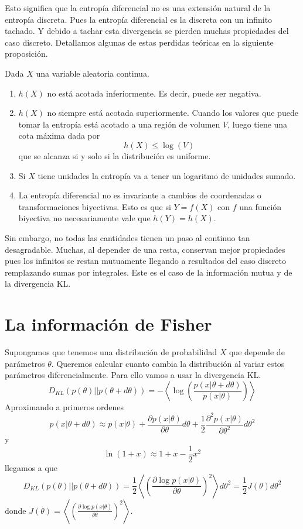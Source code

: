 Esto significa que la entrop\'ia diferencial no es una extensi\'on natural de la entrop\'ia discreta. Pues la entrop\'ia diferencial es la discreta con un infinito tachado. Y debido a tachar esta divergencia se pierden muchas propiedades del caso discreto. Detallamos algunas de estas perdidas te\'oricas en la siguiente proposici\'on.
\begin{theorem}
    Dada $X$ una variable aleatoria continua.
    \begin{enumerate}
    \item $h(X)$ no est\'a acotada inferiormente. Es decir, puede ser negativa.
    \item $h(X)$ no siempre est\'a acotada superiormente. Cuando los valores que puede tomar la entrop\'ia est\'a acotado a una regi\'on de volumen $V$, luego tiene una cota m\'axima dada por
    \begin{equation}
        h(X) \leq \log(V)
    \end{equation}
    que se alcanza si y solo si la distribuci\'on es uniforme.
    \item Si $X$ tiene unidades la entrop\'ia va a tener un logaritmo de unidades sumado.
    \item La entrop\'ia diferencial no es invariante a cambios de coordenadas o transformaciones biyectivas. Esto es que si $Y=f(X)$ con $f$ una funci\'on biyectiva no necesariamente vale que $h(Y) = h(X)$.
\end{enumerate}
\end{theorem}
Sin embargo, no todas las cantidades tienen un paso al continuo tan desagradable. Muchas, al depender de una resta, conservan mejor propiedades pues los infinitos se restan mutuamente llegando a resultados del caso discreto remplazando sumas por integrales. Este es el caso de la informaci\'on mutua y de la divergencia KL. 
\section{La informaci\'on de Fisher}
Supongamos que tenemos una distribuci\'on de probabilidad $X$ que depende de par\'ametros $\theta$. Queremos calcular cuanto cambia la distribuci\'on al variar estos par\'ametros diferencialmente. Para ello vamos a usar la divergencia KL.
$$
    D_{KL}(p(\theta)||p(\theta+d\theta))
    =    -\left\langle \log\left(\frac{p(x|\theta+d\theta)}{p(x|\theta)}\right)\right\rangle
$$
Aproximando a primeros ordenes
\begin{equation}
    p(x|\theta+d\theta)\approx p(x|\theta) + \frac{\partial p(x|\theta)}{\partial \theta}d\theta +
    \frac{1}{2}\frac{\partial^2 p(x|\theta)}{\partial \theta^2}d\theta^2
\end{equation}
y
\begin{equation}
    \ln(1+x) \approx 1+x -\frac{1}{2}x^2
\end{equation}
llegamos a que
\begin{equation}
    D_{KL}(p(\theta)||p(\theta+d\theta)) =
    \frac{1}{2}\left\langle\left( \frac{\partial \log p(x|\theta)}{\partial \theta}\right)^2\right\rangle d\theta^2 = \frac{1}{2}J(\theta)d\theta^2
\end{equation}
donde $J(\theta) = \left\langle\left( \frac{\partial \log p(x|\theta)}{\partial \theta}\right)^2\right\rangle$.

